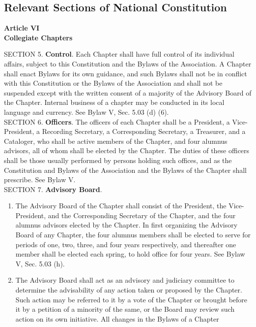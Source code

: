 \resetformat
\begin{optionalpart}
\part{Relevant Sections of National Constitution}
\begin{center}
{\bf Article VI\\
Collegiate Chapters}
\end{center}
SECTION 5. {\bf Control}. Each Chapter shall have full control of its individual affairs, subject 
to this Constitution and the Bylaws of the Association. A Chapter shall enact Bylaws for its 
own guidance, and such Bylaws shall not be in conflict with this Constitution or the Bylaws 
of the Association and shall not be suspended except with the written consent of a majority 
of the Advisory Board of the Chapter. Internal business of a chapter may be conducted in 
its local language and currency. See Bylaw V, Sec. 5.03 (d) (6). \\[1em]
SECTION 6. {\bf Officers}. The officers of each Chapter shall be a President, a Vice-President, 
a Recording Secretary, a Corresponding Secretary, a Treasurer, and a Cataloger, who shall 
be active members of the Chapter, and four alumnus advisors, all of whom shall be elected 
by the Chapter. The duties of these officers shall be those usually performed by persons 
holding such offices, and as the Constitution and Bylaws of the Association and the Bylaws 
of the Chapter shall prescribe. See Bylaw V.\\[1em]
SECTION 7. {\bf Advisory Board}.
\begin{enumerate}
\item The Advisory Board of the Chapter shall consist of 
the President, the Vice-President, and the Corresponding Secretary of the Chapter, and the 
four alumnus advisors elected by the Chapter. In first organizing the Advisory Board of 
any Chapter, the four alumnus members shall be elected to serve for periods of one, two, 
three, and four years respectively, and thereafter one member shall be elected each spring, 
to hold office for four years. See Bylaw V, Sec. 5.03 (h).
\item The Advisory Board shall act as an advisory and judiciary committee to determine the 
advisability of any action taken or proposed by the Chapter. Such action may be referred to 
it by a vote of the Chapter or brought before it by a petition of a minority of the same, or the 
Board may review such action on its own initiative. All changes in the Bylaws of a Chapter 

\end{enumerate}
\end{optionalpart}
